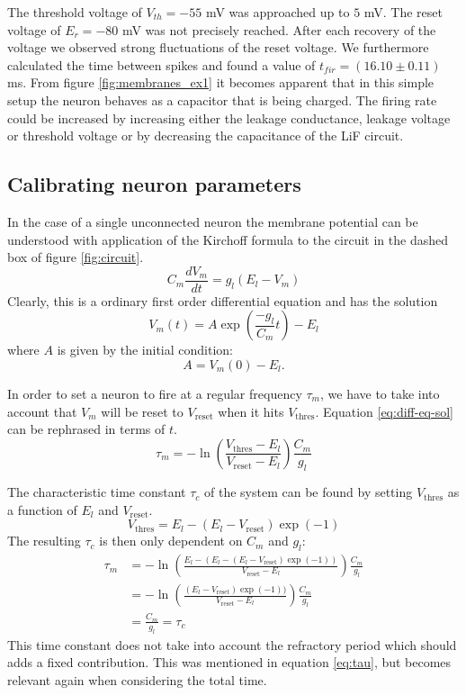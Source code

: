 \documentclass[a4paper,twocolumn]{article}
\begin{document}
The threshold voltage of $V_{th} = -55$ mV was approached up to $5$ mV.  The
reset voltage of $E_r = -80$ mV was not precisely reached.  After each recovery
of the voltage we observed strong fluctuations of the reset voltage.  We
furthermore calculated the time between spikes and found a value of
$t_{fir} = (16.10\pm 0.11)$ ms.  From figure \ref{fig:membranes_ex1} it becomes 
apparent that in this simple setup the neuron behaves as a capacitor that is
being charged.  The firing rate could be increased by increasing either the
leakage conductance,  leakage voltage or threshold voltage or by decreasing
the capacitance of the LiF circuit.

\subsection{Calibrating neuron parameters}

In the case of a single unconnected neuron the membrane potential can be
understood with application of the Kirchoff formula to the circuit in the dashed
box of figure \ref{fig:circuit}.
\[
    C_m \frac{dV_m}{dt} = g_l(E_l - V_m)
\]
Clearly, this is a ordinary first order differential equation and has the
solution
\begin{equation}
    V_m(t) = A \exp(\frac{-g_l}{C_m}t) - E_l
    \label{eq:diff-eq-sol}
\end{equation}
where $A$ is given by the initial condition:
\[
    A = V_m(0) - E_l.
\]

In order to set a neuron to fire at a regular frequency $\tau_m$, we have to take
into account that $V_m$ will be reset to $V_\text{reset}$ when it hits
$V_\text{thres}$. Equation \eqref{eq:diff-eq-sol} can be rephrased in terms of
$t$.
\begin{equation}
    \tau_m = -\ln(\frac{V_\text{thres} - E_l}{V_\text{reset} - E_l})
    \frac{C_m}{g_l}
    \label{eq:tau}
\end{equation}

The characteristic time constant $\tau_c$ of the system can be found by setting
$V_\text{thres}$ as a function of $E_l$ and $V_\text{reset}$.
\[
    V_\text{thres} = E_l - (E_l - V_\text{reset})\exp(-1)
\]
The resulting $\tau_c$ is then only dependent on $C_m$ and $g_l$:
\begin{align*}
    \tau_m &= -\ln(\frac{E_l - (E_l - (E_l - V_\text{reset})\exp(-1))}{V_\text{reset} - E_l}) \frac{C_m}{g_l}\\
           &= -\ln(\frac{(E_l - V_\text{reset})\exp(-1))}{V_\text{reset} - E_l})\frac{C_m}{g_l} \\
           &= \frac{C_m}{g_l} = \tau_c
\end{align*}
This time constant does not take into account the refractory period which should
adds a fixed contribution. This was mentioned in equation \eqref{eq:tau}, but
becomes relevant again when considering the total time.
\end{document}
